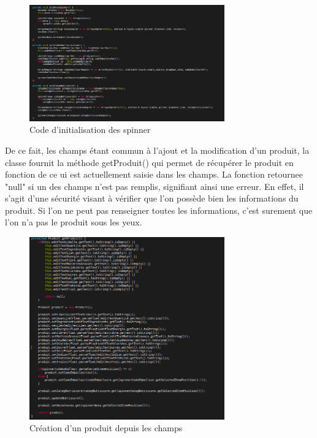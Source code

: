\documentclass[report]{BetterDocument}
\begin{document}
			\begin{figure}[H]
				\centering\includegraphics[width=0.75\textwidth, keepaspectratio]{img/activity/AbstractProduitActivity/init_spinners.png}
				\caption{Code d'initialisation des spinner}
			\end{figure}

			De ce fait, les champs étant commun à l'ajout et la modification d'un produit, la classe fournit la méthode getProduit() qui permet de récupérer le produit en fonction de ce ui est actuellement saisie dans les champs. La fonction retournee "null" si un des champs n'est pas remplis, signifiant ainsi une erreur. En effet, il s'agit d'une sécurité visant à vérifier que l'on possède bien les informations du produit. Si l'on ne peut pas renseigner toutes les informations, c'est surement que l'on n'a pas le produit sous les yeux.

			\begin{figure}[H]
				\centering\includegraphics[width=0.75\textwidth, keepaspectratio]{img/activity/AbstractProduitActivity/getProduit.png}
				\caption{Création d'un produit depuis les champs}
			\end{figure}
\end{document}
